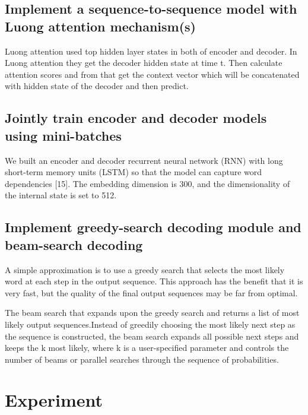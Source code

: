 \documentclass[11pt,a4paper]{article}
\begin{document}
\subsection{Implement a sequence-to-sequence model with Luong attention mechanism(s)}
Luong attention used top hidden layer states in both of encoder and decoder. In Luong attention they get the decoder hidden state at time t. Then calculate attention scores and from that get the context vector which will be concatenated with hidden state of the decoder and then predict.


\subsection{Jointly train encoder and decoder models using mini-batches}
We built an encoder and decoder recurrent neural network (RNN) with long short-term memory units (LSTM) so that the model can capture word dependencies [15]. The embedding dimension is 300, and the dimensionality of the internal state is set to 512.

\subsection{Implement greedy-search decoding module and beam-search decoding}
A simple approximation is to use a greedy search that selects the most likely word at each step in the output sequence. This approach has the benefit that it is very fast, but the quality of the final output sequences may be far from optimal.

The beam search that expands upon the greedy search and returns a list of most likely output sequences.Instead of greedily choosing the most likely next step as the sequence is constructed, the beam search expands all possible next steps and keeps the k most likely, where k is a user-specified parameter and controls the number of beams or parallel searches through the sequence of probabilities.

\section{Experiment}
\end{document}
